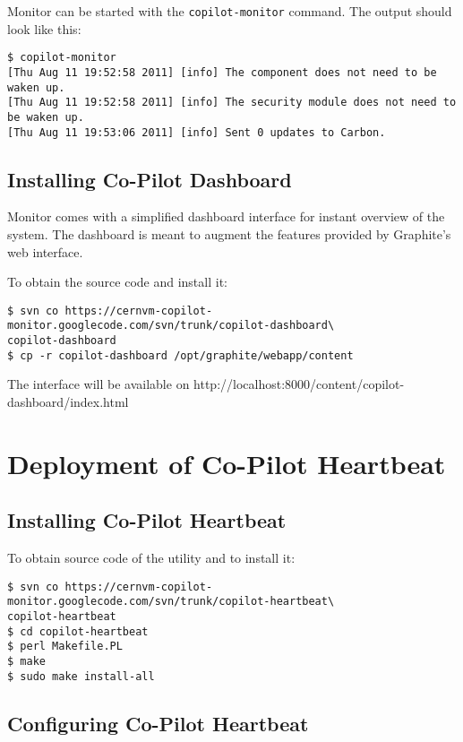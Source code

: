 Monitor can be started with the \texttt{copilot-monitor} command. The output should look like this:
\lstset{caption=Starting \copilot Monitor}
\begin{lstlisting}
$ copilot-monitor
[Thu Aug 11 19:52:58 2011] [info] The component does not need to be waken up.
[Thu Aug 11 19:52:58 2011] [info] The security module does not need to be waken up.
[Thu Aug 11 19:53:06 2011] [info] Sent 0 updates to Carbon.
\end{lstlisting}

\subsection{Installing Co-Pilot Dashboard}

Monitor comes with a simplified dashboard interface for instant overview of the system. The dashboard is meant to augment the features provided by Graphite's web interface.

To obtain the source code and install it:
\lstset{caption=Installing the Dashboard}
\begin{lstlisting}
$ svn co https://cernvm-copilot-monitor.googlecode.com/svn/trunk/copilot-dashboard\
copilot-dashboard
$ cp -r copilot-dashboard /opt/graphite/webapp/content
\end{lstlisting}

The interface will be available on http://localhost:8000/content/copilot-dashboard/index.html

\section{Deployment of Co-Pilot Heartbeat}

\subsection{Installing Co-Pilot Heartbeat}

To obtain source code of the utility and to install it:
\lstset{caption=Installing the Monitor}
\begin{lstlisting}
$ svn co https://cernvm-copilot-monitor.googlecode.com/svn/trunk/copilot-heartbeat\
copilot-heartbeat
$ cd copilot-heartbeat
$ perl Makefile.PL
$ make
$ sudo make install-all
\end{lstlisting}

\subsection{Configuring Co-Pilot Heartbeat}

